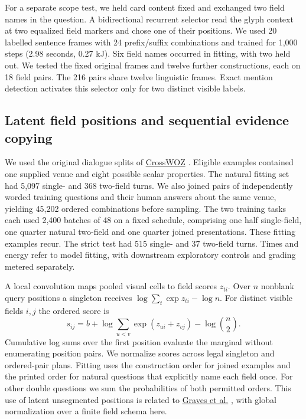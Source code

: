\documentclass[12pt,a4paper]{article}
\providecommand{\DIFadd}[1]{{\protect\color{blue} \sf #1}} %
\begin{document}
\DIFadd{For a separate scope test, we held card content fixed and exchanged two field names in the question. A bidirectional recurrent selector read the glyph context at two equalized field markers and chose one of their positions. We used 20 labelled sentence frames with 24 prefix/suffix combinations and trained for 1,000 steps (2.98 seconds, 0.27 kJ). Six field names occurred in fitting, with two held out. We tested the fixed original frames and twelve further constructions, each on 18 field pairs. The 216 pairs share twelve linguistic frames. Exact mention detection activates this selector only for two distinct visible labels.
}

\subsection*{\DIFadd{Latent field positions and sequential evidence copying}}
\DIFadd{We used the original dialogue splits of }\href{https://aclanthology.org/2020.tacl-1.19/}{\DIFadd{CrossWOZ}}\DIFadd{. Eligible examples contained one supplied venue and eight possible scalar properties. The natural fitting set had 5,097 single- and 368 two-field turns. We also joined pairs of independently worded training questions and their human answers about the same venue, yielding 45,202 ordered combinations before sampling. The two training tasks each used 2,400 batches of 48 on a fixed schedule, comprising one half single-field, one quarter natural two-field and one quarter joined presentations. These fitting examples recur. The strict test had 515 single- and 37 two-field turns. Times and energy refer to model fitting, with downstream exploratory controls and grading metered separately.
}

\DIFadd{A local convolution maps pooled visual cells to field scores $z_{ti}$. Over $n$ nonblank query positions a singleton receives $\log\sum_t \exp z_{ti}-\log n$. For distinct visible fields $i,j$ the ordered score is
}\[
 s_{ij}=b+\log\sum_{u<v}\exp(z_{ui}+z_{vj})-\log {n\choose2}.
\]
\DIFadd{Cumulative log sums over the first position evaluate the marginal without enumerating position pairs. We normalize scores across legal singleton and ordered-pair plans. Fitting uses the construction order for joined examples and the printed order for natural questions that explicitly name each field once. For other double questions we sum the probabilities of both permitted orders. This use of latent unsegmented positions is related to }\href{https://www.cs.toronto.edu/~graves/icml_2006.pdf}{\DIFadd{Graves et al.}}\DIFadd{, with global normalization over a finite field schema here.
}
\end{document}
